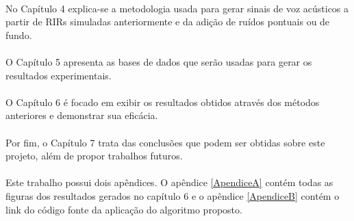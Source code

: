 \paragraph{}No Capítulo 4 explica-se a metodologia usada para gerar sinais de voz acústicos a partir de RIRs simuladas anteriormente e da adição
de ruídos pontuais ou de fundo.

\paragraph{}O Capítulo 5 apresenta as bases de dados que serão usadas para gerar os resultados experimentais.

\paragraph{}O Capítulo 6 é focado em exibir os resultados obtidos através dos métodos anteriores e demonstrar sua eficácia.

\paragraph{}Por fim, o Capítulo 7 trata das conclusões que podem ser obtidas sobre este projeto, além de propor trabalhos futuros.

\paragraph{}Este trabalho possui dois apêndices. O apêndice \ref{ApendiceA} contém todas as figuras dos resultados gerados no capítulo 6
e o apêndice \ref{ApendiceB} contém o link do código fonte da aplicação do algoritmo proposto.
